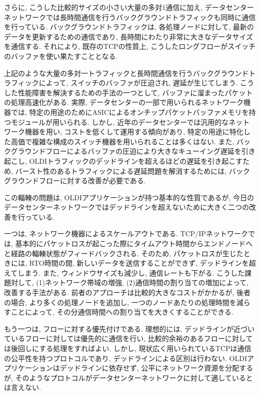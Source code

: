 さらに, こうした比較的サイズの小さい大量の多対1通信に加え,
データセンターネットワークでは長時間通信を行うバックグラウンドトラフィックも同時に通信を行っている. 
バックグラウンドトラフィックは, 各処理ノードに対して, 最新のデータを更新するための通信であり, 長時間にわたり非常に大きなデータサイズを通信する. 
それにより, 既存のTCPの性質上, こうしたロングフローがスイッチのバッファを使い果たすこととなる. 

上記のような大量の多対一トラフィックと長時間通信を行うバックグラウンドトラフィックによって, スイッチのバッファが圧迫され, 遅延が生じてしまう. 
こうした性能障害を解決するための手法の一つとして, バッファに溜まったパケットの処理高速化がある. 
実際, データセンターの一部で用いられるネットワーク機器では, 特定の用途のためにASICによるオンチップパケットバッファメモリを持つモジュールが用いられる. 
しかし, 近年のデータセンターでは汎用的なネットワーク機器を用い, コストを低くして運用する傾向があり,
特定の用途に特化した高価で複雑な構成のスイッチ機器を用いられることは多くはない.\cite{memory} 
また, バックグラウンドフローによるバッファの圧迫により大きなキューイング遅延を引き起こし,
OLDIトラフィックのデッドラインを超えるほどの遅延を引き起こすため, 
バースト性のあるトラフィックによる遅延問題を解消するためには, バックグラウンドフローに対する改善が必要である\cite{dctcp}. 

この輻輳の問題は, OLDIアプリケーションが持つ基本的な性質であるが,
今日のデータセンターネットワークではデッドラインを超えないために大きく二つの改善を行っている. 

一つは, ネットワーク機器によるスケールアウトである. 
TCP/IPネットワークでは, 基本的にパケットロスが起こった際にタイムアウト時間からエンドノードへと経路の輻輳状態がフィードバックされる. 
そのため, パケットロスが生じたときには, RTO時間の間, 新しいデータを送信することができず, デッドラインを超えてしまう. 
また, ウィンドウサイズも減少し, 通信レートも下がる. 
こうした課題対して, (1)ネットワーク帯域の増強, (2)通信時間の割り当ての増加によって, 改善する手法がある. 
前者のアプローチは比較的大きなコストがかかるが, 後者の場合, より多くの処理ノードを追加し, 一つのノードあたりの処理時間を減らすことによって,
その分通信時間への割り当てを大きくすることができる. 

もう一つは, フローに対する優先付けである. 
理想的には, デッドラインが近づいているフローに対しては優先的に通信を行い, 比較的余裕のあるフローに対しては後回しにする処理をすればよい. 
しかし, 現状広く用いられているTCPは通信の公平性を持つプロトコルであり, デッドラインによる区別は行わない. 
OLDIアプリケーションはデッドラインに依存せず, 公平にネットワーク資源を分配するが,
そのようなプロトコルがデータセンターネットワークに対して適しているとは言えない\cite{d3}. 


